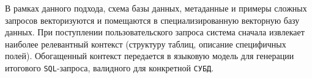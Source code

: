 В рамках данного подхода, схема базы данных, метаданные и примеры сложных запросов векторизуются и помещаются в специализированную векторную базу данных. При поступлении пользовательского запроса система сначала извлекает наиболее релевантный контекст (структуру таблиц, описание специфичных полей). Обогащенный контекст передается в языковую модель для генерации итогового \texttt{SQL}-запроса, валидного для конкретной \texttt{СУБД}.
